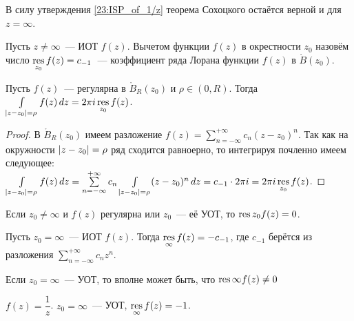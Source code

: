 \begin{corollary}
В силу утверждения \ref{23:ISP_of_1/z} теорема Сохоцкого остаётся верной и для \(z = \infty\).
\end{corollary}



\begin{definition}
Пусть \(z \ne \infty\)~--- ИОТ \(f(z)\). Вычетом функции \(f(z)\) в окрестности \(z_0\) назовём
число \(\operatorname*{res}\limits_{z_0} f(z) = c_{-1}\)~--- коэффициент ряда Лорана функции \(f(z)\) в
\(\mathring{B}(z_0)\).
\end{definition}

\begin{statement}
Пусть \(f(z)\)~--- регулярна в \(\mathring{B}_R(z_0)\) и \(\rho \in (0, R)\). Тогда
\(\int\limits_{|z - z_0| = \rho} f(z) \, dz = 2 \pi i \operatorname*{res}\limits_{z_0} f(z)\).
\end{statement}

\begin{proof}
В \(\mathring{B}_R(z_0)\) имеем разложение \(f(z) = \sum\limits_{n = - \infty}^{+ \infty} c_n
(z - z_0)^n\). Так как на окружности \(|z - z_0| \hm= \rho\) ряд сходится равноерно, то интегрируя
почленно имеем следующее: \(\int\limits_{|z - z_0| = \rho} f(z) \, dz \hm= \sum\limits_{n = - \infty}^
{+ \infty} c_n \int\limits_{|z - z_0| = \rho} (z - z_0)^n \, dz = c_{-1} \cdot 2 \pi i =
2 \pi i \res\limits_{z_0} f(z)\).
\end{proof}

\begin{note}
Если \(z_0 \ne \infty\) и \(f(z)\) регулярна или \(z_0\)~--- её УОТ, то \(\operatorname*{res}\limits{z_0} f(z) =
0\).
\end{note}

\begin{definition}
Пусть \(z_0 = \infty\)~--- ИОТ \(f(z)\). Тогда \(\operatorname*{res}\limits_{\infty} f(z) = -c_{-1}\), где
\(c_{-1}\) берётся из разложения \(\sum\limits_{n = - \infty}^{+ \infty} c_n z^n\).
\end{definition}

\begin{note}
Если \(z_0 = \infty\)~--- УОТ, то вполне может быть, что \(\operatorname*{res}\limits{\infty} f(z) \ne 0\)
\end{note}

\begin{example}
\(f(z) = \dfrac{1}{z}\). \(z_0 = \infty\)~--- УОТ, \(\operatorname*{res}\limits_{\infty} f(z) = -1\).
\end{example}

